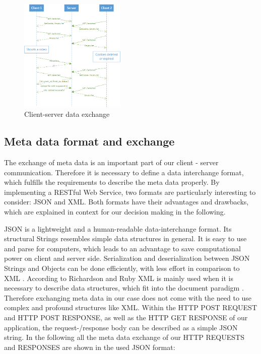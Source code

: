 \documentclass[conference]{IEEEtran}
\begin{document}
\begin{figure}[!t]
	\centering
	\includegraphics[width=0.45\textwidth]{protocol.png}
	\caption{Client-server data exchange}
	\label{fig:protocol}
\end{figure}

\subsection{Meta data format and exchange}
The exchange of meta data is an important part of our client - server communication.
Therefore it is necessary to define a data interchange format, which fulfills the requirements to describe the meta data properly.
By implementing a RESTful Web Service, two formats are particularly interesting to consider: JSON and XML.
Both formats have their advantages and drawbacks, which are explained in context for our decision making in the following.

JSON is a lightweight and a human-readable data-interchange format. Its structural Strings resembles simple data structures in general. 
It is easy to use and parse for computers, which leads to an advantage to save computational power on client and server side. 
Serialization and deserialization between JSON Strings and Objects can be done efficiently, with less effort in comparison to XML \cite{Nurseitov:2009}.
According to Richardson and Ruby XML is mainly used when it is necessary to describe data structures, which fit into the document paradigm \cite{Richardson:2007}. 
Therefore exchanging meta data in our case does not come with the need to use complex and profound structures like XML. 
Within the HTTP POST REQUEST and HTTP POST RESPONSE, as well as the HTTP GET RESPONSE  of our application, 
the request-/response body can be described as a simple JSON string. In the following all the meta data exchange of our HTTP REQUESTS and 
RESPONSES are shown in the used JSON format:
\end{document}
